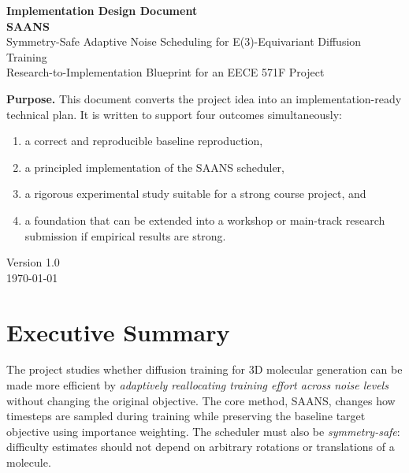 \documentclass[11pt]{report}
\begin{document}
\hypersetup{pageanchor=false}
\begin{titlepage}
    \centering
    {\LARGE \textbf{Implementation Design Document}}\\[1.25em]
    {\Huge \textbf{SAANS}}\\[0.5em]
    {\Large Symmetry-Safe Adaptive Noise Scheduling for E(3)-Equivariant Diffusion Training}\\[1.5em]
    {\large Research-to-Implementation Blueprint for an EECE 571F Project}\\[3em]

    \begin{minipage}{0.88\textwidth}
        \textbf{Purpose.} This document converts the project idea into an implementation-ready technical plan. It is written to support four outcomes simultaneously:
        \begin{enumerate}[leftmargin=2em]
            \item a correct and reproducible baseline reproduction,
            \item a principled implementation of the SAANS scheduler,
            \item a rigorous experimental study suitable for a strong course project, and
            \item a foundation that can be extended into a workshop or main-track research submission if empirical results are strong.
        \end{enumerate}
    \end{minipage}

    \vfill

    {\large Version 1.0}\\
    {\large \today}
\end{titlepage}
\hypersetup{pageanchor=true}

\tableofcontents
\clearpage

\chapter{Executive Summary}

The project studies whether diffusion training for 3D molecular generation can be made more efficient by \emph{adaptively reallocating training effort across noise levels} without changing the original objective. The core method, SAANS, changes how timesteps are sampled during training while preserving the baseline target objective using importance weighting. The scheduler must also be \emph{symmetry-safe}: difficulty estimates should not depend on arbitrary rotations or translations of a molecule.
\end{document}

